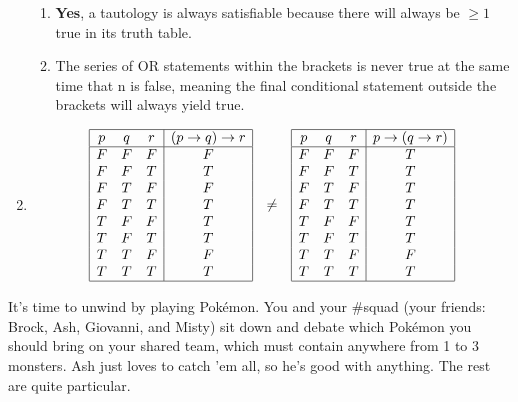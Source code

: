 \documentclass[11pt]{amsart}
\begin{document}
\begin{sol}
\begin{enumerate}
\begin{enumerate}
				\item \textbf{Yes}, a tautology is always satisfiable because there will always be $\geq1$ true in its truth table.
				\item The series of OR statements within the brackets is never true at the same time that n is false, meaning the final conditional statement outside the brackets will always yield true.
			\end{enumerate}
			\item
			\begin{displaymath}
			\begin{array}{c c c}
				\begin{array}{|c c c|c|} \hline
					p & q & r & (p \rightarrow q) \rightarrow r\\
					\hline
					F & F & F & F\\
					F & F & T & T\\
					F & T & F & F\\
					F & T & T & T\\
					T & F & F & T\\
					T & F & T & T\\
					T & T & F & F\\
					T & T & T & T\\
					\hline
				\end{array}
				&
				\neq
				&
				\begin{array}{|c c c|c|} \hline
					p & q & r & p \rightarrow (q \rightarrow r)\\
					\hline
					F & F & F & T\\
					F & F & T & T\\
					F & T & F & T\\
					F & T & T & T\\
					T & F & F & T\\
					T & F & T & T\\
					T & T & F & F\\
					T & T & T & T\\
					\hline
				\end{array}
			\end{array}
			\end{displaymath}
		\end{enumerate}
	\end{sol}
\item It's time to unwind by playing Pok\'emon.  You and your \#squad (your friends: Brock, Ash, Giovanni, and Misty) sit down and debate which Pok\'emon you should bring on your shared team, which must contain anywhere from 1 to 3 monsters.  Ash just loves to catch 'em all, so he's good with anything.  The rest are quite particular.
\end{document}
